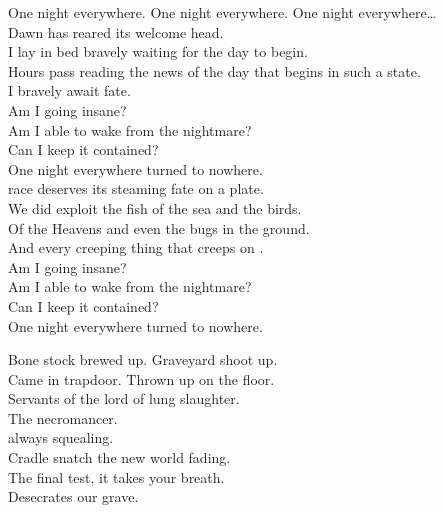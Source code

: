 


One night everywhere. One night everywhere. One night everywhere… \\

Dawn has reared its welcome head. \\
I lay in bed bravely waiting for the day to begin. \\

Hours pass reading the news of the day that begins in such a state. \\
I bravely await fate. \\

Am I going insane? \\
Am I able to wake from the nightmare? \\
Can I keep it contained? \\
One night everywhere turned to nowhere. \\

 race deserves its steaming fate on a plate. \\
We did exploit the fish of the sea and the birds. \\
Of the Heavens and even the bugs in the ground. \\
And every creeping thing that creeps on . \\

Am I going insane? \\
Am I able to wake from the nightmare? \\
Can I keep it contained? \\
One night everywhere turned to nowhere. \\




Bone stock brewed up. Graveyard shoot up. \\
Came in trapdoor. Thrown up on the floor. \\
Servants of the lord of lung slaughter. \\
The necromancer. \\

 always squealing. \\
Cradle snatch the new world fading. \\
The final test, it takes your breath. \\
Desecrates our grave. \\

